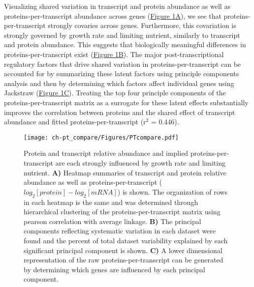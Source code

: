 Visualizing shared variation in transcript and protein abundance as well as proteins-per-transcript abundance across genes (\hyperref[ptHM]{Figure \ref{ptHM}A}), we see that proteins-per-transcript strongly covaries across genes.  Furthermore, this covariation is strongly governed by growth rate and limiting nutrient, similarly to transcript and protein abundance. This suggests that biologically meaningful differences in proteins-per-transcript exist (\hyperref[ptHM]{Figure \ref{ptHM}B}). The major post-transcriptional regulatory factors that drive shared variation in proteins-per-transcript can be accounted for by summarizing these latent factors using principle components analysis and then by determining which factors affect individual genes using Jackstraw \cite{Chung:2015bq} (\hyperref[ptHM]{Figure \ref{ptHM}C}). Treating the top four principle components of the proteins-per-transcript matrix as a surrogate for these latent effects substantially improves the correlation between proteins and the shared effect of transcript abundance and fitted proteins-per-transcript (r$^{2}$ = 0.446).

\begin{figure}[h!]
\begin{center}
\texttt{[image: ch-pt\_compare/Figures/PTcompare.pdf]}
\caption[Protein and transcript relative abundance and implied proteins-per-transcript are each strongly influenced by growth rate and limiting nutrient]{Protein and transcript relative abundance and implied proteins-per-transcript are each strongly influenced by growth rate and limiting nutrient. \textbf{A)} Heatmap summaries of transcript and protein relative abundance as well as proteins-per-transcript ($log_{2}\left[protein\right] - log_{2}\left[mRNA\right]$) is shown. The organization of rows in each heatmap is the same and was determined through hierarchical clustering of the proteins-per-transcript matrix using pearson correlation with average linkage. \textbf{B)} The principal components reflecting systematic variation in each dataset were found and the percent of total dataset variability explained by each significant principal component is shown. \textbf{C)} A lower dimensional representation of the raw proteins-per-transcript can be generated by determining which genes are influenced by each principal component.}
\label{ptHM}
\end{center}
\end{figure}

